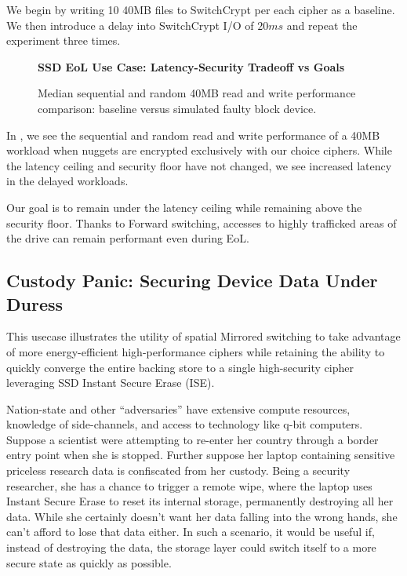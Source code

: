 We begin by writing 10 40MB files to SwitchCrypt per each cipher as a baseline.
We then introduce a delay into SwitchCrypt I/O of $20ms$ and repeat the
experiment three times.

\begin{figure}[ht] \textbf{SSD EoL Use Case: Latency-Security Tradeoff vs
   Goals}\par\medskip
   {} \caption{Median sequential and
   random 40MB read and write performance comparison: baseline versus simulated
   faulty block device.}
  \label{fig:usecase-eol-tradeoff}
\end{figure}

In , we see the sequential and random read and
write performance of a 40MB workload when nuggets are encrypted exclusively with
our choice ciphers. While the latency ceiling and security floor have not
changed, we see increased latency in the delayed workloads.

Our goal is to remain under the latency ceiling while remaining above the
security floor. Thanks to Forward switching, accesses to highly trafficked areas
of the drive can remain performant even during EoL.

\subsection{Custody Panic: Securing Device Data Under Duress}

This usecase illustrates the utility of spatial Mirrored switching to take
advantage of more energy-efficient high-performance ciphers while retaining the
ability to quickly converge the entire backing store to a single high-security
cipher leveraging SSD Instant Secure Erase (ISE).

Nation-state and other ``adversaries'' have extensive compute resources,
knowledge of side-channels, and access to technology like q-bit computers.
Suppose a scientist were attempting to re-enter her country through a border
entry point when she is stopped. Further suppose her laptop containing sensitive
priceless research data is confiscated from her custody. Being a security
researcher, she has a chance to trigger a remote wipe, where the laptop uses
Instant Secure Erase to reset its internal storage, permanently destroying all
her data. While she certainly doesn't want her data falling into the wrong
hands, she can't afford to lose that data either. In such a scenario, it would
be useful if, instead of destroying the data, the storage layer could switch
itself to a more secure state as quickly as possible.

